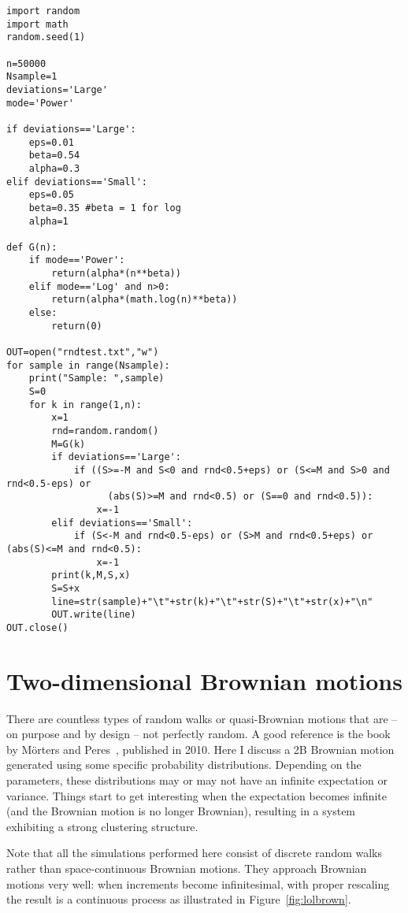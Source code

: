 \documentclass[oneside,10pt]{book}
\begin{document}
\begin{lstlisting}
import random
import math
random.seed(1) 

n=50000
Nsample=1
deviations='Large'
mode='Power' 

if deviations=='Large':
    eps=0.01
    beta=0.54
    alpha=0.3
elif deviations=='Small':
    eps=0.05
    beta=0.35 #beta = 1 for log
    alpha=1

def G(n):
    if mode=='Power':
        return(alpha*(n**beta))
    elif mode=='Log' and n>0:
        return(alpha*(math.log(n)**beta))
    else:
        return(0)

OUT=open("rndtest.txt","w")
for sample in range(Nsample):
    print("Sample: ",sample)
    S=0
    for k in range(1,n):
        x=1
        rnd=random.random()
        M=G(k)
        if deviations=='Large':
            if ((S>=-M and S<0 and rnd<0.5+eps) or (S<=M and S>0 and rnd<0.5-eps) or 
                  (abs(S)>=M and rnd<0.5) or (S==0 and rnd<0.5)):
                x=-1
        elif deviations=='Small':
            if (S<-M and rnd<0.5-eps) or (S>M and rnd<0.5+eps) or (abs(S)<=M and rnd<0.5):
                x=-1
        print(k,M,S,x)
        S=S+x
        line=str(sample)+"\t"+str(k)+"\t"+str(S)+"\t"+str(x)+"\n" 
        OUT.write(line)   
OUT.close()      

\end{lstlisting}


\section{Two-dimensional Brownian motions}



There are countless types of random walks or quasi-Brownian motions that are -- on purpose and by design -- not perfectly random.  A good reference is the book by Mörters and Peres~\cite{peresbrown}, published in 2010. Here I discuss a 2B Brownian motion generated using some specific probability distributions. Depending on the parameters, these distributions may or may not have an infinite expectation or variance. Things start to get interesting when the expectation becomes infinite (and the Brownian motion is no
 longer Brownian), resulting in a system exhibiting a strong clustering structure. 

Note that all the simulations performed here consist of discrete random walks rather than 
 space-continuous Brownian motions.
 They approach Brownian motions very well: when increments become infinitesimal, with proper rescaling the result is a continuous process
 as illustrated in Figure~\ref{fig:lolbrown}.
   
\end{document}
